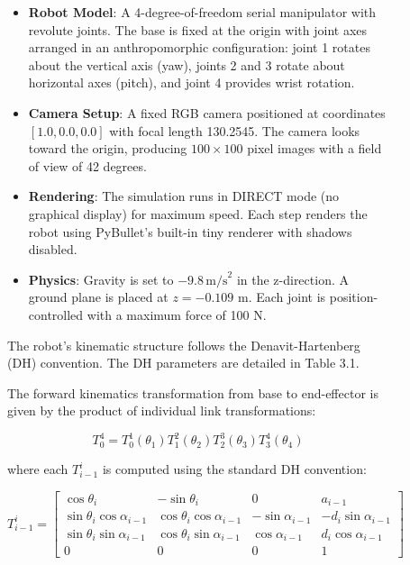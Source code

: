 \documentclass[12pt,a4paper,oneside]{report}
\begin{document}
\begin{figure}[H]
\begin{itemize}
    \item \textbf{Robot Model}: A 4-degree-of-freedom serial manipulator with revolute joints. The base is fixed at the origin with joint axes arranged in an anthropomorphic configuration: joint 1 rotates about the vertical axis (yaw), joints 2 and 3 rotate about horizontal axes (pitch), and joint 4 provides wrist rotation.
    \item \textbf{Camera Setup}: A fixed RGB camera positioned at coordinates $[1.0, 0.0, 0.0]$ with focal length 130.2545. The camera looks toward the origin, producing $100 \times 100$ pixel images with a field of view of 42 degrees.
    \item \textbf{Rendering}: The simulation runs in DIRECT mode (no graphical display) for maximum speed. Each step renders the robot using PyBullet's built-in tiny renderer with shadows disabled.
    \item \textbf{Physics}: Gravity is set to $-9.8 \, \text{m/s}^2$ in the z-direction. A ground plane is placed at $z = -0.109$ m. Each joint is position-controlled with a maximum force of 100 N.
\end{itemize}

The robot's kinematic structure follows the Denavit-Hartenberg (DH) convention. The DH parameters are detailed in Table 3.1.

The forward kinematics transformation from base to end-effector is given by the product of individual link transformations:

\begin{equation}
T_{0}^{4} = T_{0}^{1}(\theta_1) T_{1}^{2}(\theta_2) T_{2}^{3}(\theta_3) T_{3}^{4}(\theta_4)
\end{equation}

where each $T_{i-1}^{i}$ is computed using the standard DH convention:

\begin{equation}
T_{i-1}^{i} = 
\begin{bmatrix}
\cos\theta_i & -\sin\theta_i & 0 & a_{i-1} \\
\sin\theta_i \cos\alpha_{i-1} & \cos\theta_i \cos\alpha_{i-1} & -\sin\alpha_{i-1} & -d_i \sin\alpha_{i-1} \\
\sin\theta_i \sin\alpha_{i-1} & \cos\theta_i \sin\alpha_{i-1} & \cos\alpha_{i-1} & d_i \cos\alpha_{i-1} \\
0 & 0 & 0 & 1
\end{bmatrix}
\end{equation}


\end{figure}
\end{document}
